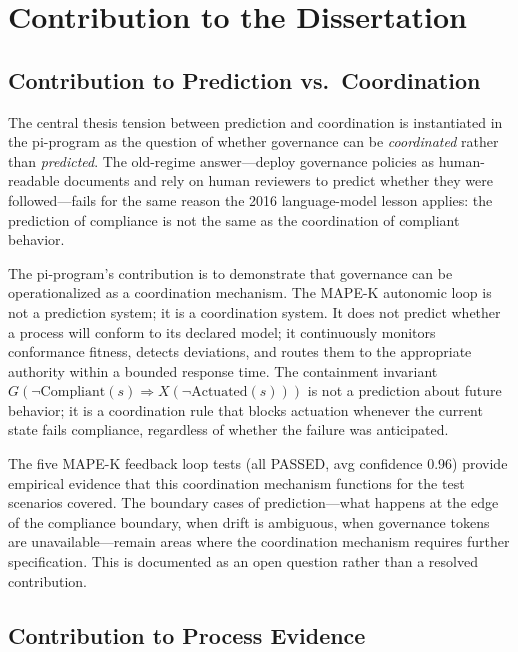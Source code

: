 
\section{Contribution to the Dissertation}
\label{sec:research-pi-program-contribution}

\subsection{Contribution to Prediction vs.~Coordination}
\label{sec:research-pi-program-contribution-prediction}

The central thesis tension between prediction and coordination is instantiated in the pi-program as the question of whether governance can be \textit{coordinated} rather than \textit{predicted}. The old-regime answer---deploy governance policies as human-readable documents and rely on human reviewers to predict whether they were followed---fails for the same reason the 2016 language-model lesson applies: the prediction of compliance is not the same as the coordination of compliant behavior.

The pi-program's contribution is to demonstrate that governance can be operationalized as a coordination mechanism. The MAPE-K autonomic loop is not a prediction system; it is a coordination system. It does not predict whether a process will conform to its declared model; it continuously monitors conformance fitness, detects deviations, and routes them to the appropriate authority within a bounded response time. The containment invariant $G(\lnot\mathrm{Compliant}(s) \Rightarrow X(\lnot\mathrm{Actuated}(s)))$ is not a prediction about future behavior; it is a coordination rule that blocks actuation whenever the current state fails compliance, regardless of whether the failure was anticipated.

The five MAPE-K feedback loop tests (all PASSED, avg confidence 0.96) provide empirical evidence that this coordination mechanism functions for the test scenarios covered. The boundary cases of prediction---what happens at the edge of the compliance boundary, when drift is ambiguous, when governance tokens are unavailable---remain areas where the coordination mechanism requires further specification. This is documented as an open question rather than a resolved contribution.

\subsection{Contribution to Process Evidence}
\label{sec:research-pi-program-contribution-evidence}

